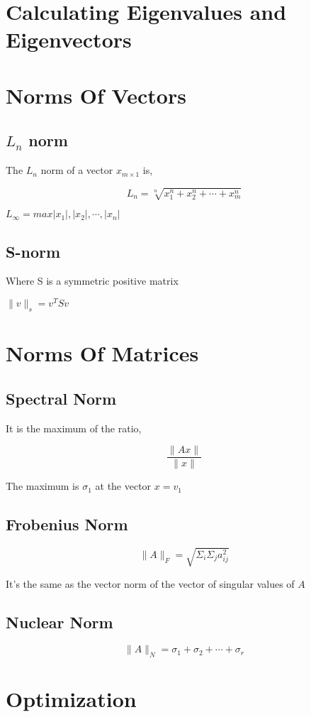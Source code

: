 \documentclass[11pt]{report}
\begin{document}
\chapter{Calculating Eigenvalues and Eigenvectors}
\label{sec:org169ae98}
\chapter{Norms Of Vectors}
\label{sec:org38b4dfc}
\section{\(L_n\) norm}
\label{sec:org7e380dc}
The \(L_n\) norm of a vector \(x_{m \times 1}\) is,

$$L_n =\sqrt[n]{x_1^n + x_2^n + \cdots + x_m^n}$$

\(L_\infty = max{|x_1|, |x_2|, \cdots , |x_n|}\)
\section{S-norm}
\label{sec:orgc0ba30c}
Where S is a symmetric positive matrix

\(\|v\|_s = v^T S v\)
\chapter{Norms Of Matrices}
\label{sec:orgda19af4}
\section{Spectral Norm}
\label{sec:org82cbdc8}
It is the maximum of the ratio,

$$\frac{\|Ax\|}{\|x\|}$$

The maximum is \(\sigma_1\) at the vector \(x=v_1\)
\section{Frobenius Norm}
\label{sec:org9fc26ee}

$$\|A\|_F = \sqrt{\Sigma_i \Sigma_j a_{ij}^2}$$

It's the same as the vector norm of the vector of singular values of \(A\)
\section{Nuclear Norm}
\label{sec:orgc0b8b0b}

$$\|A\|_N = \sigma_1 + \sigma_2 + \cdots + \sigma_r$$
\chapter{Optimization}
\label{sec:org568379c}
\end{document}
